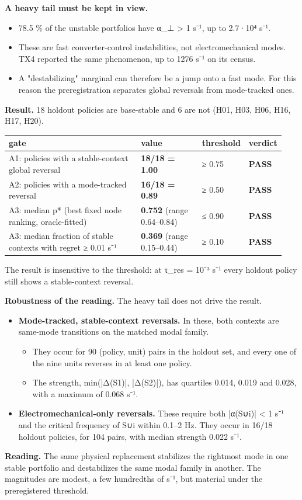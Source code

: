 \documentclass[10pt,a4paper]{article}
\begin{document}
\textbf{A heavy tail must be kept in view.}

\begin{itemize}
\item 78.5 \% of the unstable portfolios have α\_⊥ > 1 s⁻¹, up to 2.7·10⁴ s⁻¹.
\item These are fast converter-control instabilities, not electromechanical modes. TX4 reported the same phenomenon, up to 1276 s⁻¹ on its census.
\item A "destabilizing" marginal can therefore be a jump onto a fast mode. For this reason the preregistration separates global reversals from mode-tracked ones.
\end{itemize}
\textbf{Result.} 18 holdout policies are base-stable and 6 are not (H01, H03, H06, H16, H17, H20).

{\small
\begin{longtable}{L{0.546\linewidth}L{0.242\linewidth}L{0.081\linewidth}L{0.072\linewidth}}
\toprule
\textbf{gate} & \textbf{value} & \textbf{threshold} & \textbf{verdict} \\
\midrule
\endhead
A1: policies with a stable-context global reversal & \textbf{18/18 = 1.00} & ≥ 0.75 & \textbf{PASS} \\
A2: policies with a mode-tracked reversal & \textbf{16/18 = 0.89} & ≥ 0.50 & \textbf{PASS} \\
A3: median p* (best fixed node ranking, oracle-fitted) & \textbf{0.752} (range 0.64–0.84) & ≤ 0.90 & \textbf{PASS} \\
A3: median fraction of stable contexts with regret ≥ 0.01 s⁻¹ & \textbf{0.369} (range 0.15–0.44) & ≥ 0.10 & \textbf{PASS} \\
\bottomrule
\end{longtable}}
The result is insensitive to the threshold: at τ\_res = 10⁻³ s⁻¹ every holdout policy still shows a stable-context reversal.

\textbf{Robustness of the reading.} The heavy tail does not drive the result.

\begin{itemize}
\item \textbf{Mode-tracked, stable-context reversals.} In these, both contexts are same-mode transitions on the matched modal family.
\begin{itemize}
\item They occur for 90 (policy, unit) pairs in the holdout set, and every one of the nine units reverses in at least one policy.
\item The strength, min(|Δ(S1)|, |Δ(S2)|), has quartiles 0.014, 0.019 and 0.028, with a maximum of 0.068 s⁻¹.
\end{itemize}
\item \textbf{Electromechanical-only reversals.} These require both |α(S∪i)| < 1 s⁻¹ and the critical frequency of S∪i within 0.1–2 Hz. They occur in 16/18 holdout policies, for 104 pairs, with median strength 0.022 s⁻¹.
\end{itemize}
\textbf{Reading.} The same physical replacement stabilizes the rightmost mode in one stable portfolio and destabilizes the same modal family in another. The magnitudes are modest, a few hundredths of s⁻¹, but material under the preregistered threshold.
\end{document}
